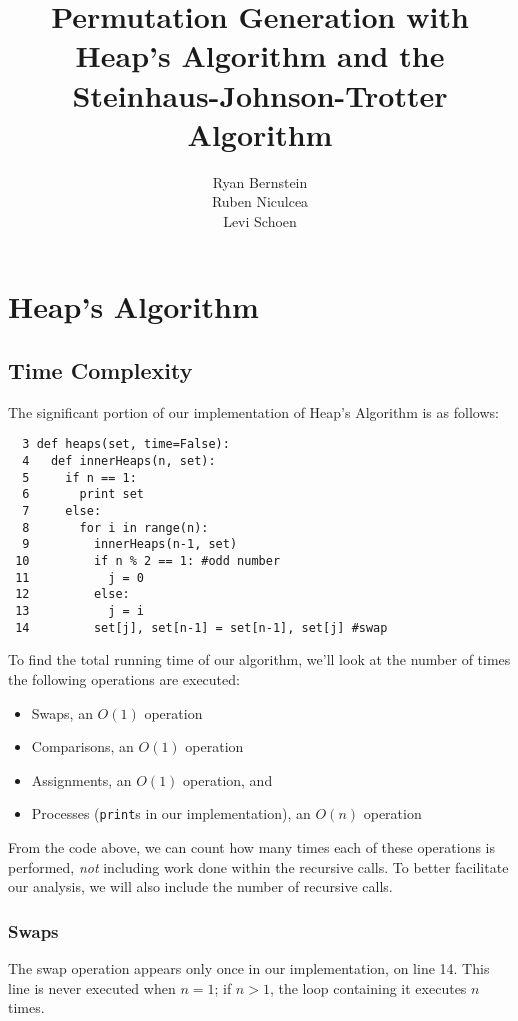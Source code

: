 \documentclass[11pt, oneside]{article}   	%
\title{Permutation Generation with Heap's Algorithm and the Steinhaus-Johnson-Trotter Algorithm}
\author{Ryan Bernstein \\ Ruben Niculcea \\ Levi Schoen}
\date{}							%
\begin{document}
\maketitle

\tableofcontents
\newpage

\section{Heap's Algorithm}

\subsection{Time Complexity}

The significant portion of our implementation of Heap's Algorithm is as follows:
\begin{verbatim}
  3 def heaps(set, time=False):
  4   def innerHeaps(n, set):
  5     if n == 1:
  6       print set
  7     else:
  8       for i in range(n):
  9         innerHeaps(n-1, set)
 10         if n % 2 == 1: #odd number
 11           j = 0
 12         else:
 13           j = i
 14         set[j], set[n-1] = set[n-1], set[j] #swap
\end{verbatim}

To find the total running time of our algorithm, we'll look at the number of times the following operations are executed:
\begin{itemize}
	\item Swaps, an $O(1)$ operation
	\item Comparisons, an $O(1)$ operation
	\item Assignments, an $O(1)$ operation, and
	\item Processes (\texttt{print}s in our implementation), an $O(n)$ operation
\end{itemize}

From the code above, we can count how many times each of these operations is performed, \emph{not} including work done within the recursive calls. To better facilitate our analysis, we will also include the number of recursive calls.

\subsubsection{Swaps}

The swap operation appears only once in our implementation, on line 14. This line is never executed when $n=1$; if $n > 1$, the loop containing it executes $n$ times.
\end{document}
